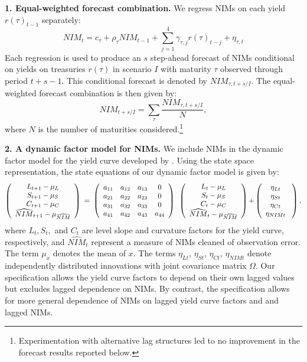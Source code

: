 \documentclass[11pt]{article}
\renewcommand{\baselinestretch}{1.5}
\begin{document}
\noindent \textbf{1. Equal-weighted forecast combination.} We regress NIMs on each yield $r(\tau )_{t-1}$ separately: \
\[
NIM_{t}=c_{\tau }+\rho _{\tau }NIM_{t-1}+\sum_{j=1}^4\gamma _{\tau,j}r(\tau)_{t-j}+{\eta
_{\tau ,t}}
\]
Each regression is used to produce an $s$ step-ahead forecast of NIMs conditional on yields on treasuries $r(\tau)$ in scenario $I$ with maturity $\tau$ observed through period $t+s-1.$ This conditional forecast is denoted by $NIM_{\tau,t+s/I}.$ The equal-weighted forecast combination is then given by:
\[
NIM_{t+s/I}=\sum_{\tau }\frac{NIM_{\tau ,t+s/I}}{N},
\]
where $N$ is the number of maturities considered.\renewcommand{\baselinestretch}{1.0}\footnote{Experimentation with alternative lag structures led to no improvement in the forecast results reported below.\vspace{0.05in}}\renewcommand{\baselinestretch}{1.5}

\noindent \textbf{2. A dynamic factor model for NIMs.} We include NIMs in the dynamic factor model for the yield curve developed by . Using the state space representation, the state equations of our dynamic factor model is given by:
\[
\left(
\begin{array}{c}
{L_{t+1}-\mu _{L}} \\
{S_{t+1}-\mu _{S}} \\
{C_{t+1}-\mu _{C}} \\
\widehat{NIM}_{t+1}-\mu _{\widehat{NIM}}%
\end{array}%
\right) {\normalsize \ =\ }\left(
\begin{array}{cccc}
a_{11} & a_{12} & a_{13} & 0 \\
a_{21} & a_{22} & a_{23} & 0 \\
a_{31} & a_{32} & a_{33} & 0 \\
a_{41} & a_{42} & a_{43} & a_{44}%
\end{array}%
\right) {\normalsize \ }\left(
\begin{array}{c}
{L_{t}-\mu _{L}} \\
{S_{t}-\mu _{S}} \\
{C_{t}-\mu _{C}} \\
\widehat{NIM}_{t}-\mu _{\widehat{NIM}}%
\end{array}%
\right) {\normalsize +}\left(
\begin{array}{c}
{\eta _{Lt}} \\
{\eta _{St}} \\
{\eta _{Ct}} \\
{\eta _{NIMt}}%
\end{array}%
{\normalsize \ }\right) ,
\]
where $L_{t},S_{t},$ and $C_{t}$ are level slope and curvature factors for the yield curve, respectively, and $\widehat{NIM}_{t}$ represent a measure of NIMs cleaned of observation error. The term $\mu _{x}$ denotes the mean of $x$. The terms ${\eta _{Lt}}$, ${\eta _{St}}$, ${\eta _{Ct}}$, ${\eta_{NIMt}}$ denote independently distributed innovations with joint covariance matrix $\Omega $. Our specification allows the yield curve factors to depend on their own lagged values but excludes lagged dependence on NIMs. By contrast, the specification allows for more general dependence of NIMs on lagged yield curve factors and and lagged NIMs.
\end{document}
